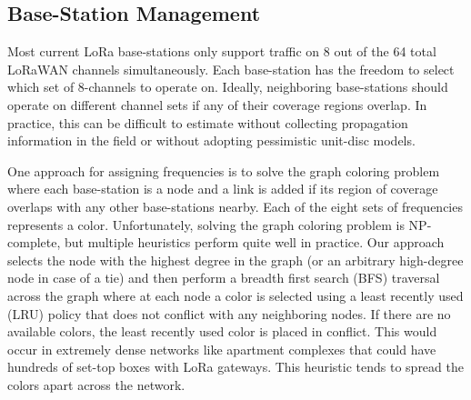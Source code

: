 


\subsection{Base-Station Management}\label{sec:bsm}

Most current LoRa base-stations only support traffic on 8 out of the 64 total LoRaWAN channels simultaneously. Each base-station has the freedom to select which set of 8-channels to operate on.  Ideally, neighboring base-stations should operate on different channel sets if any of their coverage regions overlap.  In practice, this can be difficult to estimate without collecting propagation information in the field or without adopting pessimistic unit-disc models.   

One approach for assigning frequencies is to solve the graph coloring problem where each base-station is a node and a link is added if its region of coverage overlaps with any other base-stations nearby.  Each of the eight sets of frequencies represents a color.  Unfortunately, solving the graph coloring problem is NP-complete, but multiple heuristics perform quite well in practice.  Our approach selects the node with the highest degree in the graph (or an arbitrary high-degree node in case of a tie) and then perform a breadth first search (BFS) traversal across the graph where at each node a color is selected using a least recently used (LRU) policy that does not conflict with any neighboring nodes.  If there are no available colors, the least recently used color is placed in conflict. This would occur in extremely dense networks like apartment complexes that could have hundreds of set-top boxes with LoRa gateways.  This heuristic tends to spread the colors apart across the network. 

